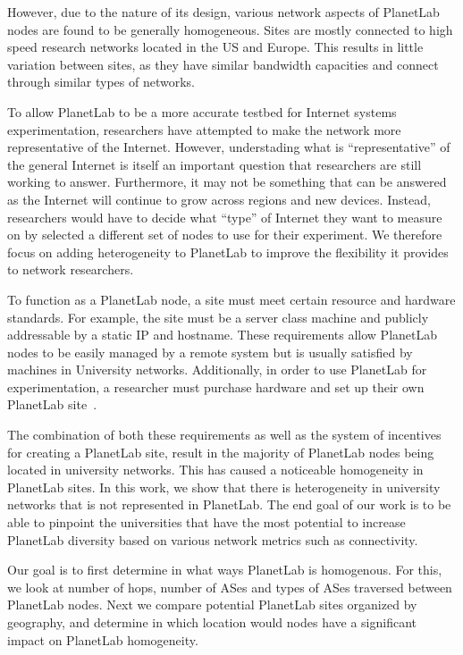 \documentclass{sig-alternate-10pt}
\begin{document}
However, due to the nature of its design, various network aspects of PlanetLab
nodes are found to be generally homogeneous. Sites are mostly connected to high
speed research networks located in the US and Europe. This results in little
variation between sites, as they have similar bandwidth capacities and connect
through similar types of networks.

To allow PlanetLab to be a more accurate testbed for Internet systems
experimentation, researchers have attempted to make the network more
representative of the Internet. However, understading what is
``representative'' of the general Internet is itself an important question that
researchers are still working to answer. Furthermore, it may not be something
that can be answered as the Internet will continue to grow across regions and
new devices. Instead, researchers would have to decide what ``type'' of
Internet they want to measure on by selected a different set of nodes to use
for their experiment.  We therefore focus on adding heterogeneity to PlanetLab
to improve the flexibility it provides to network researchers.

To function as a PlanetLab node, a site must meet certain resource and hardware
standards. For example, the site must be a server class machine and publicly
addressable by a static IP and hostname. These requirements allow PlanetLab
nodes to be easily managed by a remote system but is usually satisfied by
machines in University networks.  Additionally, in order to use PlanetLab for
experimentation, a researcher must purchase hardware and set up their own
PlanetLab site~\cite{dischinger:satellitelab}.

The combination of both these requirements as well as the system of incentives
for creating a PlanetLab site, result in the majority of PlanetLab nodes being
located in university networks. This has caused a noticeable homogeneity in
PlanetLab sites.  In this work, we show that there is heterogeneity in
university networks that is not represented in PlanetLab. The end goal of our
work is to be able to pinpoint the universities that have the most potential to
increase PlanetLab diversity based on various network metrics such as
connectivity.

Our goal is to first determine in what ways PlanetLab is homogenous. For this,
we look at number of hops, number of ASes and types of ASes traversed between
PlanetLab nodes. Next we compare potential PlanetLab sites organized by
geography, and determine in which location would nodes have a significant
impact on PlanetLab homogeneity.
\end{document}
